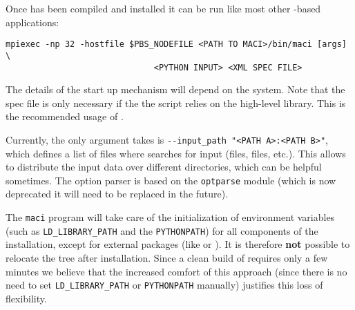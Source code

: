 
Once \MACI has been compiled and installed it can be run like most other \MPI-based applications:
\begin{lstlisting}[style=SHELL]
mpiexec -np 32 -hostfile $PBS_NODEFILE <PATH TO MACI>/bin/maci [args] \
                              <PYTHON INPUT> <XML SPEC FILE>
\end{lstlisting}
The details of the \MPI start up mechanism will depend on the system. Note that the \XML spec file is only necessary if the the \PYTHON script relies on the high-level \PYTHON library. This is the recommended usage of \MACI. 

Currently, the only argument \MACI takes is \lstinline[style=SHELL]|--input_path "<PATH A>:<PATH B>"|, which defines a list of files where \MACI searches for input (\XML files, \PYTHON files, etc.). This allows to distribute the input data over different directories, which can be helpful sometimes. The option parser is based on the \lstinline[style=CODE]|optparse| module (which is now deprecated it will need to be replaced in the future).

The \lstinline[style=SHELL]|maci| program will take care of the initialization of environment variables (such as \lstinline[style=SHELL]|LD_LIBRARY_PATH| and the \lstinline[style=SHELL]|PYTHONPATH|) for all components of the installation, except for external packages (like \TRILINOS or \PETSC). It is therefore \textbf{not} possible to relocate the \MACI tree after installation. Since a clean build of \MACI requires only a few minutes we believe that the increased comfort of this approach (since there is no need to set \lstinline[style=SHELL]|LD_LIBRARY_PATH| or \lstinline[style=SHELL]|PYTHONPATH| manually) justifies this loss of flexibility.
